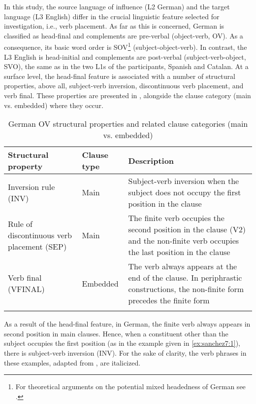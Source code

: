 \documentclass[output=paper,modfonts,nonflat, newtxmath]{langsci/langscibook}
\begin{document}
In this study, the source language of influence (L2 German) and the target language (L3 English) differ in the crucial linguistic feature selected for investigation, i.e., verb placement. As far as this is concerned, German is classified as head-final \citep{Beck1998} and complements are pre-verbal (object-verb, OV). As a consequence, its basic word order is SOV\footnote{For theoretical arguments on the potential mixed headedness of German see \citet{Abraham1992}.}  (subject-object-verb). In contrast, the L3 English is head-initial and complements are post-verbal (subject-verb-object, SVO), the same as in the two L1s of the participants, Spanish and Catalan. At a surface level, the head-final feature is associated with a number of structural properties, above all, subject-verb inversion, discontinuous verb placement, and verb final. These properties are presented in , alongside the clause category (main vs. embedded) where they occur.

\begin{table}
\caption{German OV structural properties and related clause categories (main vs. embedded)\label{tab:sanchez7:1}}
\begin{tabularx}{\textwidth}{Q l Q}
\lsptoprule
 Structural property & Clause type & Description\\
 \midrule
Inversion rule (INV) & Main & Subject-verb inversion when the subject does not occupy the first position in the clause\\
\tablevspace
Rule of discontinuous verb placement (SEP) & Main & The finite verb occupies the second position in the clause (V2) and the non-finite verb occupies the last position in the clause\\
\tablevspace
Verb final (VFINAL) & Embedded & The verb always appears at the end of the clause. In periphrastic constructions, the non-finite form precedes the finite form\\
\lspbottomrule
\end{tabularx}
\end{table}

As a result of the head-final feature, in German, the finite verb always appears in second position in main clauses. Hence, when a constituent other than the subject occupies the first position (as in the example given in \ref{ex:sanchez7:1}), there is subject-verb inversion (INV). For the sake of clarity, the verb phrases in these examples, adapted from \citet{Sánchez2016}, are italicized.
\end{document}
